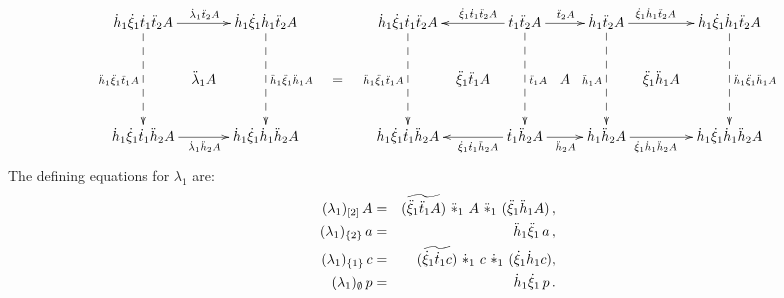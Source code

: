 $$
\xymatrix @C=0.5pc @R=2pc{
\dhho\dxo\dtto\ddttt A 
\ar[rr]^{\dlo\ddttt A} 
\ar@{-->}[dd]_{\ddhho\ddxo\ddtto A}
 & & \dhho\dxo\dhho\ddttt A 
     \ar@{-->}[dd]^{\ddhho\ddxo\ddhho A} 
     & & & & \dhho\dxo\dtto\ddttt A 
             \ar@{-->}[dd]_{\ddhho\ddxo\ddtto A} 
             & & \dtto\ddttt A 
                 \ar[ll]_(0.4){\dxo\dtto\ddttt A}
                 \ar[rr]^{\ddttt A} 
                 \ar@{-->}[dd]^{\ddtto A} 
                 & & \dhho\ddttt A 
                     \ar@{-->}[dd]_{\ddhho A} 
                     \ar[rr]^(0.4){\dxo\dhho\ddttt A}
                     & & \dhho\dxo\dhho\ddttt A 
                         \ar@{-->}[dd]^{\ddhho\ddxo\ddhho A} \\
 & \ddlo A 
   & & & = 
         & & & \ddxo\ddtto A 
               & & A 
                   & & \ddxo\ddhho A
                       & \\ 
\dhho\dxo\dtto\ddhht A 
\ar[rr]_{\dlo\ddhht A}
 & & \dhho\dxo\dhho\ddhht A 
     & & & & \dhho\dxo\dtto\ddhht A 
             & & \dtto\ddhht A 
                 \ar[ll]^(0.4){\dxo\dtto\ddhht A} 
                 \ar[rr]_{\ddhht A}
                 & & \dhho\ddhht A 
                     \ar[rr]_(0.4){\dxo\dhho\ddhht A} 
                     & & \dhho\dxo\dhho\ddhht A \\
}
$$
The defining equations for $\lambda_1$ are:
\begin{eqnarray} \label{eq:lambdao}
(\lambda_1)_{[2]}\,A 
  &=& (\widetilde{\ddot{\xi}_1\ddot{t}_1 A}) ~\ddot{\ast}_1~ A ~\ddot{\ast}_1~ (\ddot{\xi}_1\ddot{h}_1 A)\,,\\
(\lambda_1)_{\{2\}}\,a 
  &=& \ddot{h}_1\ddot{\xi}_1\,a\,, \nonumber \\
(\lambda_1)_{\{1\}}\,c 
  &=& (\widetilde{\dot{\xi}_1\dot{t}_1 c}) ~\dot{\ast}_1~ c ~\dot{\ast}_1~ (\dot{\xi}_1\dot{h}_1 c), \nonumber \\
(\lambda_1)_{\emptyset}\,p 
  &=& \dot{h}_1\dot{\xi}_1\,p\,. \nonumber
\end{eqnarray}

